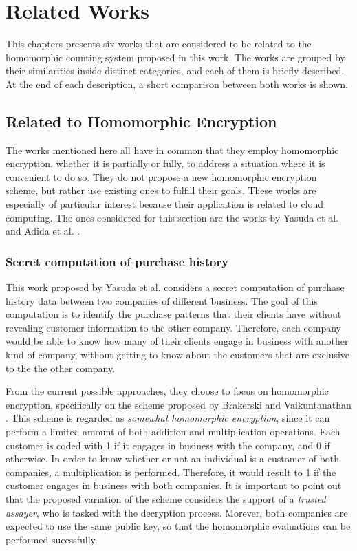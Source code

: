 \chapter{Related Works}
\label{relatedWorks}

This chapters presents six works that are considered to be related to the homomorphic counting system proposed in this work. The works are grouped by their similarities inside distinct categories, and each of them is briefly described. At the end of each description, a short comparison between both works is shown. 

\section{{Related to Homomorphic Encryption}}
The works mentioned here all have in common that they employ homomorphic encryption, whether it is partially or fully, to address a situation where it is convenient to do so. They do not propose a new homomorphic encryption scheme, but rather use existing ones to fulfill their goals. These works are especially of particular interest because their application is related to cloud computing. The ones considered for this section are the works by Yasuda et al. \cite{Yasuda:2015:SDD:2732516.2732521, yasuda2014} and Adida et al. \cite{adida2008helios}.

\subsection{Secret computation of purchase history}
This work proposed by Yasuda et al. \cite{yasuda2014} considers a secret computation of purchase history data between two companies of different business. The goal of this computation is to identify the purchase patterns that their clients have without revealing customer information to the other company. Therefore, each company would be able to know how many of their clients engage in business with another kind of company, without getting to know about the customers that are exclusive to the the other company.

From the current possible approaches, they choose to focus on homomorphic encryption, specifically on the scheme proposed by Brakerski and Vaikuntanathan \cite{cryptoeprint:2011:277}. This scheme is regarded as \emph{somewhat homomorphic encryption}, since it can perform a limited amount of both addition and multiplication operations. Each customer is coded with 1 if it engages in business with the company, and 0 if otherwise. In order to know whether or not an individual is a customer of both companies, a multiplication is performed. Therefore, it would result to 1 if the customer engages in business with both companies. It is important to point out that the proposed variation of the scheme considers the support of a \emph{trusted assayer}, who is tasked with the decryption process. Morever, both companies are expected to use the same public key, so that the homomorphic evaluations can be performed sucessfully.

